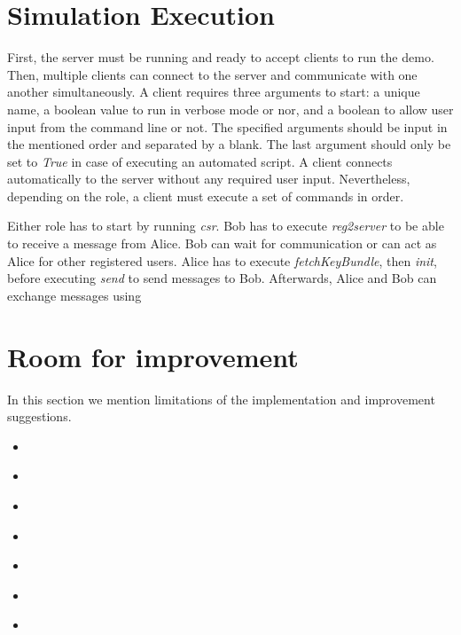 \section{Simulation Execution}
First, the server must be running and ready to accept clients to run the demo. Then, multiple clients can connect to the server and communicate with one another simultaneously. A client requires three arguments to start: a unique name, a boolean value to run in verbose mode or nor, and a boolean to allow user input from the command line or not. The specified arguments should be input in the mentioned order and separated by a blank. The last argument should only be set to \textit{True} in case of executing an automated script. A client connects automatically to the server without any required user input. Nevertheless, depending on the role, a client must execute a set of commands in order.
\par
Either role has to start by running \textit{csr}. Bob has to execute \textit{reg2server} to be able to receive a message from Alice. Bob can wait for communication or can act as Alice for other registered users. Alice has to execute \textit{fetchKeyBundle}, then \textit{init}, before executing \textit{send} to send messages to Bob. Afterwards, Alice and Bob can exchange messages using 

\section{Room for improvement}
In this section we mention limitations of the implementation and improvement suggestions.
\begin{itemize}
	\item \textit{}
	\item \textit{}
	\item \textit{}
	\item \textit{}
	\item \textit{}
	\item \textit{}
	\item \textit{}
\end{itemize}


